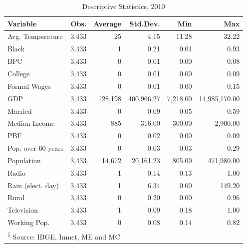 \documentclass[12pt,]{article}
\begin{document}
\begin{table}[!h]

\caption{\label{tab:desc.2010}Descriptive Statistics, 2010}
\centering
\begin{tabular}{lrrrrr}
\toprule
Variable & Obs. & Average & Std.Dev. & Min & Max\\
\midrule
Avg. Temperature & 3,433 & 25 & 4.15 & 11.28 & 32.22\\
Black & 3,433 & 1 & 0.21 & 0.01 & 0.93\\
BPC & 3,433 & 0 & 0.01 & 0.00 & 0.08\\
College & 3,433 & 0 & 0.01 & 0.00 & 0.09\\
Formal Wages & 3,433 & 0 & 0.01 & 0.00 & 0.15\\
\addlinespace
GDP & 3,433 & 128,198 & 400,966.27 & 7,218.00 & 14,985,170.00\\
Married & 3,433 & 0 & 0.09 & 0.05 & 0.59\\
Median Income & 3,433 & 885 & 316.00 & 300.00 & 2,900.00\\
PBF & 3,433 & 0 & 0.02 & 0.00 & 0.09\\
Pop. over 60 years & 3,433 & 0 & 0.03 & 0.03 & 0.29\\
\addlinespace
Population & 3,433 & 14,672 & 20,161.23 & 805.00 & 471,980.00\\
Radio & 3,433 & 1 & 0.14 & 0.13 & 1.00\\
Rain (elect. day) & 3,433 & 1 & 6.34 & 0.00 & 149.20\\
Rural & 3,433 & 0 & 0.20 & 0.00 & 0.96\\
Television & 3,433 & 1 & 0.09 & 0.18 & 1.00\\
\addlinespace
Working Pop. & 3,433 & 0 & 0.08 & 0.14 & 0.82\\
\bottomrule
\multicolumn{6}{l}{\textsuperscript{1} Source: IBGE, Inmet, ME and MC}\\
\end{tabular}
\end{table}
\end{document}
